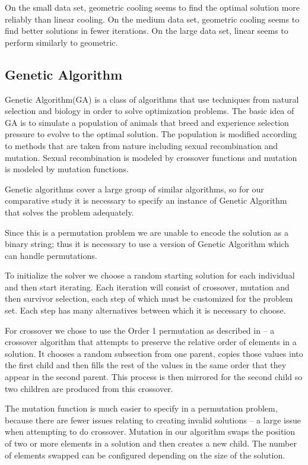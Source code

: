 \documentclass[a4paper]{article}
\begin{document}
On the small data set, geometric cooling seems to find the optimal solution more reliably than linear cooling. On the medium data set, geometric cooling seems to find better solutions in fewer iterations. On the large data set, linear seems to perform similarly to geometric.


\subsection{Genetic Algorithm} %

Genetic Algorithm(GA) is a class of algorithms that use techniques from natural selection and biology in order to solve optimization problems. The basic idea of GA is to simulate a population of animals that breed and experience selection pressure to evolve to the optimal solution. The population is modified according to methods that are taken from nature including sexual recombination and mutation. Sexual recombination is modeled by crossover functions and mutation is modeled by mutation functions.

Genetic algorithms cover a large group of similar algorithms, so for our comparative study it is necessary to specify an instance of Genetic Algorithm that solves the problem adequately.

Since this is a permutation problem we are unable to encode the solution as a binary string; thus it is necessary to use a version of Genetic Algorithm which can handle permutations.

To initialize the solver we choose a random starting solution for each individual and then start iterating. Each iteration will consist of crossover, mutation and then survivor selection, each step of which must be customized for the problem set. Each step has many alternatives between which it is necessary to choose.

For crossover we chose to use the Order 1 permutation as described in \cite{Eiben} -- a crossover algorithm that attempts to preserve the relative order of elements in a solution. It chooses a random subsection from one parent, copies those values into the first child and then fills the rest of the values in the same order that they appear in the second parent. This process is then mirrored for the second child so two children are produced from this crossover.

The mutation function is much easier to specify in a permutation problem, because there are fewer issues relating to creating invalid solutions -- a large issue when attempting to do crossover. Mutation in our algorithm swaps the position of two or more elements in a solution and then creates a new child. The number of elements swapped can be configured depending on the size of the solution.
\end{document}
